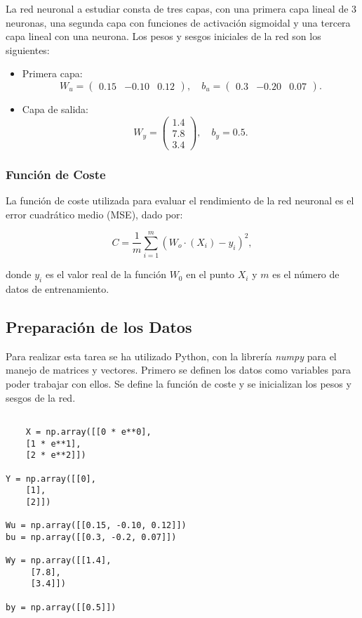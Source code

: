 \documentclass[paper=a4, fontsize=11pt]{scrartcl} %
\numberwithin{equation}{section} %
\numberwithin{figure}{section} %
\numberwithin{table}{section} %
\begin{document}
La red neuronal a estudiar consta de tres capas, con una primera capa lineal de 3 neuronas, una segunda capa con funciones de activación sigmoidal y una tercera capa lineal con una neurona. Los pesos y sesgos iniciales de la red son los siguientes:

\begin{itemize}
    \item Primera capa:
    \[
    W_u = \begin{pmatrix} 0.15 & -0.10 & 0.12 \end{pmatrix}, \quad b_u = \begin{pmatrix} 0.3 & -0.20 & 0.07 \end{pmatrix}.
    \]
    
    \item Capa de salida:
    \[
    W_y = \begin{pmatrix} 1.4 \\ 7.8 \\ 3.4 \end{pmatrix}, \quad b_y = 0.5.
    \]

\end{itemize}

\subsubsection{Función de Coste}

La función de coste utilizada para evaluar el rendimiento de la red neuronal es el error cuadrático medio (MSE), dado por:

\[
C = \frac{1}{m} \sum_{i=1}^m (W_o\cdot(X_i) - y_{i})^2,
\]

donde \( y_i \) es el valor real de la función \( W_0 \) en el punto \( X_i \) y \( m \) es el número de datos de entrenamiento.

\subsection{Preparación de los Datos}

Para realizar esta tarea se ha utilizado Python, con la librería \textit{numpy} para el manejo de matrices y vectores. 
Primero se definen los datos como variables para poder trabajar con ellos. Se define la función de coste y se inicializan los pesos y sesgos de la red.

\vspace{2mm}
\begin{lstlisting}

    X = np.array([[0 * e**0],
    [1 * e**1],
    [2 * e**2]])

Y = np.array([[0],
    [1],
    [2]])

Wu = np.array([[0.15, -0.10, 0.12]])
bu = np.array([[0.3, -0.2, 0.07]])

Wy = np.array([[1.4],
     [7.8],
     [3.4]])

by = np.array([[0.5]])

\end{lstlisting}
\vspace{2mm}
\end{document}
